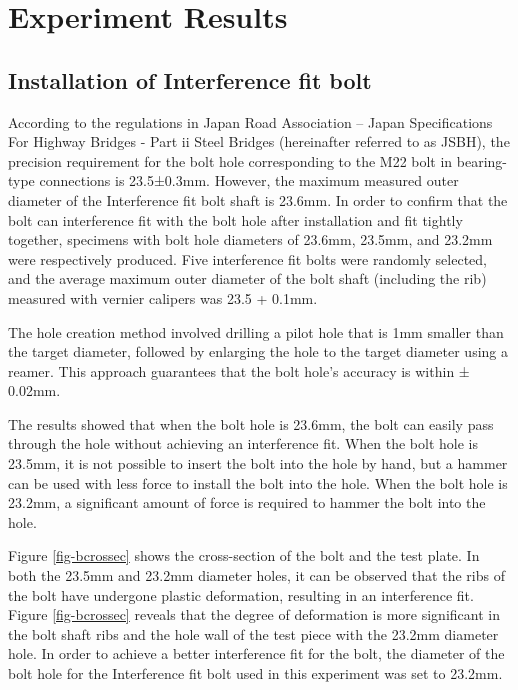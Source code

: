 \section{Experiment Results}

\subsection{Installation of Interference fit bolt}
According to the regulations in Japan Road Association -- Japan Specifications For Highway Bridges - Part ii Steel Bridges\cite{douji2017} (hereinafter referred to as JSBH), the precision requirement for the bolt hole corresponding to the M22 bolt in bearing-type connections is 23.5±0.3mm. However, the maximum measured outer diameter of the Interference fit bolt shaft is 23.6mm. In order to confirm that the bolt can interference fit with the bolt hole after installation and fit tightly together, specimens with bolt hole diameters of 23.6mm, 23.5mm, and 23.2mm were respectively produced. Five interference fit bolts were randomly selected, and the average maximum  outer diameter of the bolt shaft (including the rib) measured with vernier calipers was 23.5 + 0.1mm.

The hole creation method involved drilling a pilot hole that is 1mm smaller than the target diameter, followed by enlarging the hole to the target diameter using a reamer. This approach guarantees that the bolt hole's accuracy is within ± 0.02mm.

The results showed that when the bolt hole is 23.6mm, the bolt can easily pass through the hole without achieving an interference fit. When the bolt hole is 23.5mm, it is not possible to insert the bolt into the hole by hand, but a hammer can be used with less force to install the bolt into the hole. When the bolt hole is 23.2mm, a significant amount of force is required to hammer the bolt into the hole.

Figure \ref{fig-bcrossec} shows the cross-section of the bolt and the test plate. In both the 23.5mm and 23.2mm diameter holes, it can be observed that the ribs of the bolt have undergone plastic deformation, resulting in an interference fit. Figure \ref{fig-bcrossec} reveals that the degree of deformation is more significant in the bolt shaft ribs and the hole wall of the test piece with the 23.2mm diameter hole. In order to achieve a better interference fit for the bolt, the diameter of the bolt hole for the Interference fit bolt used in this experiment was set to 23.2mm.


